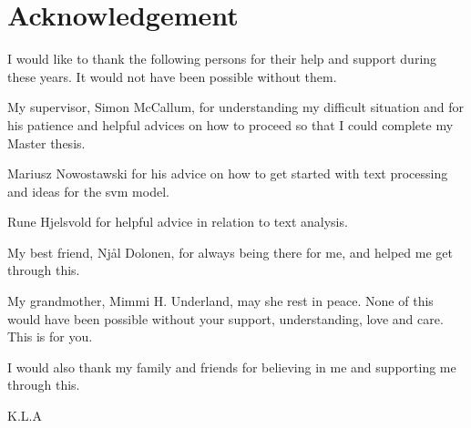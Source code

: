 \chapter*{Acknowledgement}
I would like to thank the following persons for their help and support during these years. It would not have been possible without them.

My supervisor, Simon McCallum, for understanding my difficult situation and for his patience and helpful advices on how to proceed so that I could complete my Master thesis.

Mariusz Nowostawski for his advice on how to get started with text processing and ideas for the \gls{svm} model. 

Rune Hjelsvold for helpful advice in relation to text analysis.

My best friend, Njål Dolonen, for always being there for me, and helped me get through this.

My grandmother, Mimmi H. Underland, may she rest in peace. None of this would have been possible without your support, understanding, love and care. This is for you.

I would also thank my family and friends for believing in me and supporting me through this.

\begin{flushright}
K.L.A
\end{flushright}
